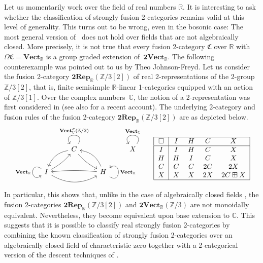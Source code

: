 \documentclass[10pt,a4paper]{amsart}
\numberwithin{equation}{section}
\begin{document}
\begin{Remark}
Let us momentarily work over the field of real numbers $\mathbb{R}$. It is interesting to ask whether the classification of strongly fusion 2-categories remains valid at this level of generality. This turns out to be wrong, even in the bosonic case: The most general version of~\cite[Theorem~A]{JFY} does not hold over fields that are not algebraically closed. More precisely, it is not true that every fusion 2-category $\mathfrak{C}$ over $\mathbb{R}$ with $\Omega\mathfrak{C} = \mathbf{Vect}_{\mathbb{R}}$ is a group graded extension of~$\mathbf{2Vect}_{\mathbb{R}}$. The following counterexample was pointed out to us by Theo Johnson-Freyd. Let us consider the fusion 2-category $\mathbf{2Rep}_{\mathbb{R}}(\mathbb{Z}/3[2])$ of real 2-representations of the 2-group $\mathbb{Z}/3[2]$, that is, finite semisimple $\mathbb{R}$-linear 1-categories equipped with an action of $\mathbb{Z}/3[1]$. Over the complex numbers~$\mathbb{C}$, the notion of a 2-representation was first considered in \cite[Section 6]{El2} (see also \cite[Section 1.4.5]{DR} for a recent account). The underlying 2-category and fusion rules of the fusion 2-category $\mathbf{2Rep}_{\mathbb{R}}(\mathbb{Z}/3[2])$ are as depicted below.
 \begin{displaymath}
\begin{tabular}{c c}
$\begin{tikzcd}
& C \arrow[ld, bend right] \arrow[rd, bend right = 10] \arrow["\mathbf{Vect}^{\sigma}_{\mathbb{C}}(\mathbb{Z}/2)"', loop, distance=2em, in=125, out=55] & & X \arrow["\mathbf{Vect}_{\mathbb{C}}"', loop, distance=2em, in=125, out=55] \\
I \arrow[rr, bend right] \arrow[ru, bend right = 10] \arrow["\mathbf{Vect}_{\mathbb{R}}"', loop, distance=2em, in=215, out=145] & & H \arrow[lu, bend right] \arrow[ll, bend right = 5] \arrow["\mathbf{Vect}_{\mathbb{H}}"', loop, distance=2em, in=35, out=325] & \end{tikzcd}$&$\begin{tabular}{ |c| c c c c | }
 \hline
 $\Box$ & $I$ & $H$ & $C$ & $X$\\
 \hline
 $I$ & $I$ & $H$ & $C$ & $X$\\
 $H$ & $H$ & $I$ & $C$ & $X$\\
 $C$ & $C$ & $C$ & $2C$ & $2X$\\
 $X$ & $X$ & $X$ & $2X$ & $2C\boxplus X$\\
 \hline
\end{tabular}$
\end{tabular}\end{displaymath}
In particular, this shows that, unlike in the case of algebraically closed fields \cite[Example~1.4.22]{DR}, the fusion 2-categories $\mathbf{2Rep}_{\mathbb{R}}(\mathbb{Z}/3[2])$ and $\mathbf{2Vect}_{\mathbb{R}}(\mathbb{Z}/3)$ are not monoidally equivalent. Nevertheless, they become equivalent upon base extension to $\mathbb{C}$. This suggests that it is possible to classify real strongly fusion 2-categories by combining the known classification of strongly fusion 2-categories over an algebraically closed field of characteristic zero together with a 2-categorical version of the descent techniques of \cite{EG}.
\end{Remark}
\end{document}
